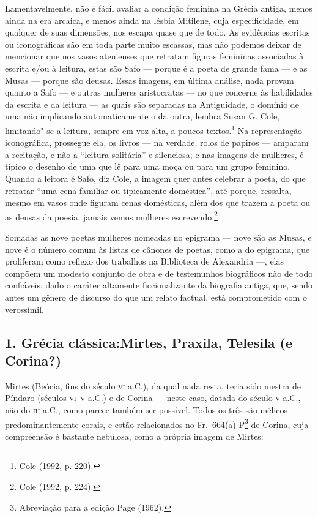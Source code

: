 Lamentavelmente, não é fácil avaliar a condição feminina na Grécia
antiga, menos ainda na era arcaica, e menos ainda na lésbia Mitilene, cuja
especificidade, em qualquer de suas dimensões, nos escapa quase que
de todo. As evidências escritas ou iconográficas são em toda parte muito
escassas, mas não podemos deixar de mencionar que nos vasos atenienses que
retratam figuras femininas associadas à escrita e/ou à leitura, estas são Safo
--- porque é a poeta de grande fama --- e as Musas --- porque são deusas.
Essas imagens, em última análise, nada provam quanto a Safo --- e outras mulheres
aristocratas --- no que concerne às habilidades da escrita e da leitura --- as
quais são separadas na Antiguidade, o domínio de uma não implicando
automaticamente o da outra, lembra Susan G. Cole, limitando"-se a
leitura, sempre em voz alta, a poucos textos.\footnote{ Cole (1992, p. 220).} Na representação iconográfica,
prossegue ela, os livros --- na verdade, rolos de papiros --- amparam a
recitação, e não a “leitura solitária” e silenciosa; e nas imagens de mulheres,
é típico o desenho de uma que lê para uma moça ou para um grupo feminino.
Quando a leitora é Safo, diz Cole, a imagem quer antes celebrar a poeta, do que
retratar “uma cena familiar ou tipicamente doméstica”, até porque, ressalta,
mesmo em vasos onde figuram cenas domésticas, além dos que trazem a poeta ou as
deusas da poesia, jamais vemos mulheres escrevendo.\footnote{ Cole (1992, p. 224).}


Somadas as nove poetas mulheres nomeadas no epigrama --- nove são as Musas, e nove é o número comum às listas de cânones de poetas, como a do epigrama, que proliferam como reflexo dos trabalhos na Biblioteca de Alexandria ---,
elas compõem um modesto conjunto de obra e de testemunhos biográficos
não de todo confiáveis, dado o caráter altamente ficcionalizante da
biografia antiga, que, sendo antes um gênero de discurso do que um relato
factual, está comprometido com o verossímil.

\subsection*{1. Grécia clássica:\break Mirtes, Praxila, Telesila (e
Corina?)}

\smallskip

Mirtes (Beócia, fins do século \textsc{vi} a.C.), da qual nada resta, teria sido mestra
de Píndaro (séculos \textsc{vi}--\textsc{v} a.C.) e de Corina --- neste caso, datada do século \textsc{v}
a.C., não do \textsc{iii} a.C., como parece também ser possível. Todos os três são
mélicos predominantemente corais, e estão relacionados no Fr.~664(a)
P\footnote{ Abreviação para a edição Page (1962).}  de Corina, cuja compreensão
é bastante nebulosa, como a própria imagem de Mirtes:


